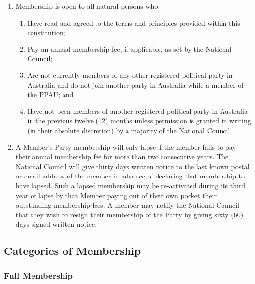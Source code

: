 \documentclass[a4paper,titlepage,8.5pt]{article}
\begin{document}
\begin{enumerate}
\item Membership is open to all natural persons who:
\begin{enumerate}
\item Have read and agreed to the terms and principles provided within this constitution;
\item Pay an annual membership fee, if applicable, as set by the National Council;
\item Are not currently members of any other registered political party in Australia and do not join another party in Australia while a member of the PPAU; and
\item Have not been members of another registered political party in Australia in the previous twelve (12) months unless permission is granted in writing (in their absolute discretion) by a majority of the National Council.
\end{enumerate}
\item A Member's Party membership will only lapse if the member fails to pay their annual membership fee for more than two consecutive years. The National Council will give thirty days written notice to the last known postal or email address of the member in advance of declaring that membership to have lapsed. Such a lapsed membership may be re-activated during its third year of lapse by that Member paying out of their own pocket their outstanding membership fees. A member may notify the National Council that they wish to resign their membership of the Party by giving sixty (60) days signed written notice.
\end{enumerate}

\subsection{Categories of Membership}

\subsubsection{Full Membership}
\end{document}
